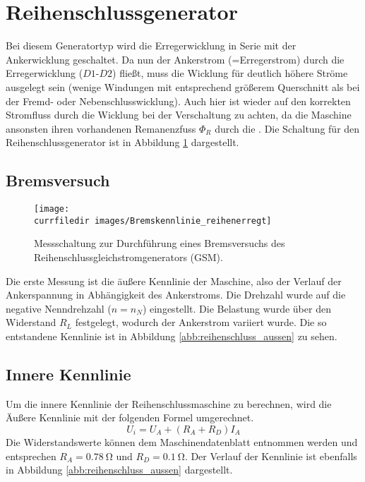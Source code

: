 \section{Reihenschlussgenerator}
Bei diesem Generatortyp wird die Erregerwicklung in Serie mit der Ankerwicklung geschaltet. Da nun der Ankerstrom (=Erregerstrom) durch die Erregerwicklung ($D1$-$D2$) fließt, muss die Wicklung für deutlich höhere Ströme ausgelegt sein (wenige Windungen mit entsprechend größerem Querschnitt als bei der Fremd- oder Nebenschlusswicklung). Auch hier ist wieder auf den korrekten Stromfluss durch die Wicklung bei der Verschaltung zu achten, da die Maschine ansonsten ihren vorhandenen Remanenzfuss $\Phi_R$ durch die . Die Schaltung für den Reihenschlussgenerator ist in Abbildung \ref{abb:reihen_BKL_Messschaltung} dargestellt. 
\subsection{Bremsversuch}
\begin{figure} [htb]
    \centering
    \texttt{[image: \\currfiledir images/Bremskennlinie\_reihenerregt]}
    \caption{Messschaltung zur Durchführung eines Bremsversuchs des Reihen\-schluss\-gleich\-strom\-generators (GSM).}
    \label{abb:reihen_BKL_Messschaltung}
\end{figure}
Die erste Messung ist die äußere Kennlinie der Maschine, also der Verlauf der Ankerspannung in Abhängigkeit des Ankerstroms. Die Drehzahl wurde auf die negative Nenndrehzahl  ($n=n_N$) eingestellt. Die Belastung wurde über den Widerstand $R_L$ festgelegt, wodurch der Ankerstrom variiert wurde. Die so entstandene Kennlinie ist in Abbildung \ref{abb:reihenschluss_aussen} zu sehen.
\subsection{Innere Kennlinie}
Um die innere Kennlinie der Reihenschlussmaschine zu berechnen, wird die Äußere Kennlinie mit der folgenden Formel umgerechnet.
\begin{equation*}
    U_i=U_A + (R_A+R_D) I_A
\end{equation*}
Die Widerstandswerte können dem Maschinendatenblatt entnommen werden und entsprechen $R_A = \SI{0.78}{\ohm}$ und $R_D = \SI{0.1}{\ohm}$. Der Verlauf der Kennlinie ist ebenfalls in Abbildung \ref{abb:reihenschluss_aussen} dargestellt.

%